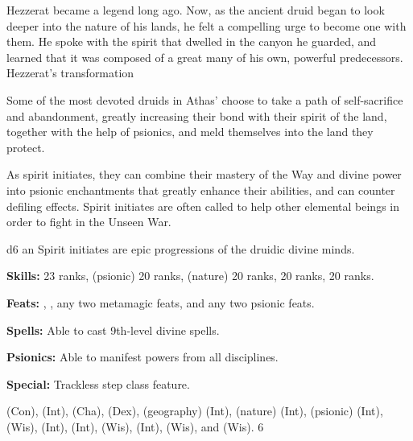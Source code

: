 {
Hezzerat became a legend long ago. Now, as the ancient druid began to look deeper into the nature of his lands, he felt a compelling urge to become one with them. He spoke with the spirit that dwelled in the canyon he guarded, and learned that it was composed of a great many of his own, powerful predecessors.
}{Hezzerat's transformation}
{
Some of the most devoted druids in Athas' choose to take a path of self-sacrifice and abandonment, greatly increasing their bond with their spirit of the land, together with the help of psionics, and meld themselves into the land they protect.

As spirit initiates, they can combine their mastery of the Way and divine power into psionic enchantments that greatly enhance their abilities, and can counter defiling effects. Spirit initiates are often called to help other elemental beings in order to fight in the Unseen War.
}
{d6}
{an}
{
Spirit initiates are epic progressions of the druidic divine minds.
}
{
\textbf{Skills:}  23 ranks,  (psionic) 20 ranks,  (nature) 20 ranks,  20 ranks,  20 ranks.

\textbf{Feats:} , , any two metamagic feats, and any two psionic feats.

\textbf{Spells:} Able to cast 9th-level divine spells.

\textbf{Psionics:} Able to manifest powers from all disciplines.

\textbf{Special:} Trackless step class feature.
}
{
 (Con),
 (Int),
 (Cha),
 (Dex),
 (geography) (Int),
 (nature) (Int),
 (psionic) (Int),
 (Wis),
 (Int),
 (Int),
 (Wis),
 (Int),
 (Wis),
and  (Wis).
}
{6}
{\EpicTable}
